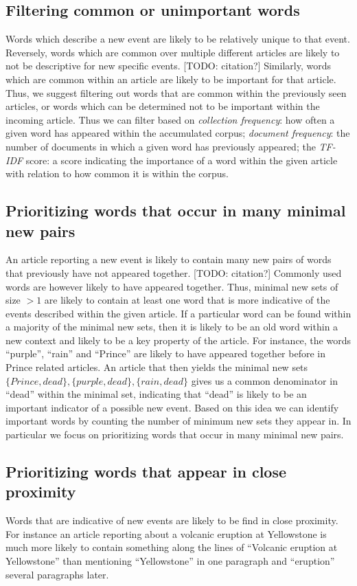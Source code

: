 \subsection{Filtering common or unimportant words}
Words which describe a new event are likely to be relatively unique to that event. Reversely, words which are common over multiple different articles are likely to not be descriptive for new specific events. [TODO: citation?] Similarly, words which are common within an article are likely to be important for that article. Thus, we suggest filtering out words that are common within the previously seen articles, or words which can be determined not to be important within the incoming article. Thus we can filter based on \emph{collection frequency}: how often a given word has appeared within the accumulated corpus; \emph{document frequency}: the number of documents in which a given word has previously appeared; the \emph{TF-IDF} score: a score indicating the importance of a word within the given article with relation to how common it is within the corpus.

\subsection{Prioritizing words that occur in many minimal new pairs}
An article reporting a new event is likely to contain many new pairs of words that previously have not appeared together. [TODO: citation?] Commonly used words are however likely to have appeared together. Thus, minimal new sets of size $>1$ are likely to contain at least one word that is more indicative of the events described within the given article. If a particular word can be found within a majority of the minimal new sets, then it is likely to be an old word within a new context and likely to be a key property of the article. For instance, the words ``purple'', ``rain'' and ``Prince'' are likely to have appeared together before in Prince related articles. An article that then yields the minimal new sets $\{Prince, dead\}, \{purple, dead\}, \{rain, dead\}$ gives us a  common denominator in ``dead'' within the minimal set, indicating that ``dead'' is likely to be an important indicator of a possible new event. Based on this idea we can identify important words by counting the number of minimum new sets they appear in. In particular we focus on prioritizing words that occur in many minimal new pairs.

\subsection{Prioritizing words that appear in close proximity}
Words that are indicative of new events are likely to be find in close proximity. For instance an article reporting about a volcanic eruption at Yellowstone is much more likely to contain something along the lines of ``Volcanic eruption at Yellowstone'' than mentioning ``Yellowstone'' in one paragraph and ``eruption'' several paragraphs later.

